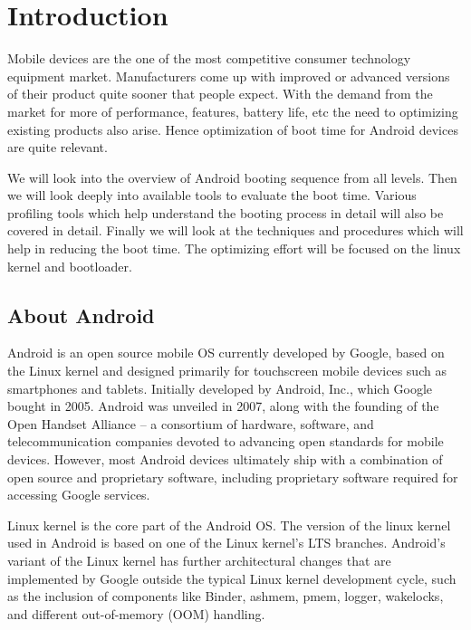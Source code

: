 

\section{Introduction}
\label{report}


\hspace{8mm} 

\noindent Mobile devices are the one of the most competitive consumer technology equipment market.
Manufacturers come up with improved or advanced versions of their product quite sooner that
people expect. With the demand from the market for more of performance, features, battery
life, etc the need to optimizing existing products also arise. Hence optimization of boot time
for Android devices are quite relevant.

We will look into the overview of Android booting sequence from all levels. Then we will look
deeply into available tools to evaluate the boot time. Various profiling tools which help understand
the booting process in detail will also be covered in detail. Finally we will look at the techniques
and procedures which will help in reducing the boot time. The optimizing effort will be focused on the
linux kernel and bootloader.

\subsection{About Android}

Android is an open source mobile OS currently developed by Google, based on the Linux kernel and designed
primarily for touchscreen mobile devices such as smartphones and tablets. Initially developed
by Android, Inc., which Google bought in 2005. Android was unveiled in 2007, along with the
founding of the Open Handset Alliance – a consortium of hardware, software, and telecommunication
companies devoted to advancing open standards for mobile devices. However, most Android devices
ultimately ship with a combination of open source and proprietary software, including proprietary
software required for accessing Google services.


Linux kernel is the core part of the Android OS. The version of the linux kernel used in Android is
based on one of the Linux kernel's LTS branches. Android's variant of the Linux kernel has further
architectural changes that are implemented by Google outside the typical Linux kernel development
cycle, such as the inclusion of components like Binder, ashmem, pmem, logger, wakelocks,
and different out-of-memory (OOM) handling.

